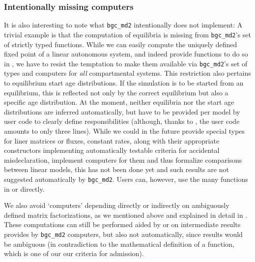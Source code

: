 \subsubsection{Intentionally missing computers}
It is also interesting to note what \texttt{bgc\_md2} intentionally does not implement:
A trivial example is that the computation of equilibria is missing from \texttt{bgc\_md2}'s set of strictly typed functions. 
While we can easily compute the uniquely defined fixed point of a linear
autonomous system, and indeed provide functions to do so in \LAPM{}, we have to
resist the temptation to make them available via \texttt{bgc\_md2}'s set of
types and computers for \emph{all} compartmental systems. 
This restriction also pertains to equilibrium start age distributions. 
If the simulation is to be started from an equilibrium, this is reflected not only by the correct equilibrium
but also a specific age distribution.  
At the moment, neither equilibria nor the start age distributions 
are inferred automatically, but have to be provided per model by 
user code to clearly define responsibilities (although, thanks to \LAPM{}, the user code amounts to only three lines).
While we could in the future provide special types for liner matrices or
fluxes, constant rates, along with their appropriate constructors implementing
automatically testable criteria for accidental misdeclaration, implement
computers for them and thus formalize comparisons between linear models,
this has not been done yet and such results are not suggested automatically by \texttt{bgc\_md2}.
Users can, however, use the many functions in \LAPM{} or \CompartmentalSystems{} directly.

We also avoid `computers' depending directly or indirectly on ambiguously defined matrix factorizations, 
as we mentioned above and explained in detail in . 
These computations can still be performed aided by \LAPM{} or \CompartmentalSystems{} on intermediate results
provides by \texttt{bgc\_md2} computers, but also not automatically, since results would be ambiguous (in contradiction to the mathematical definition of a function, which is one of our our criteria for admission). 


